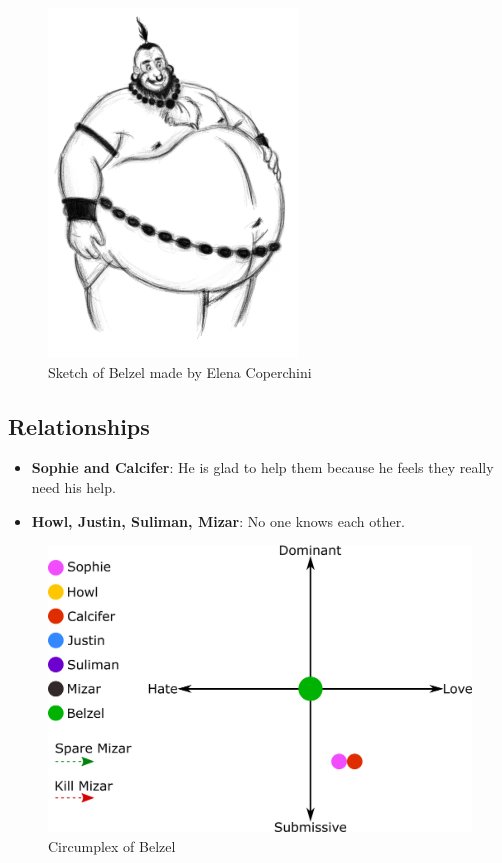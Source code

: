 \hfill\begin{minipage}{0.4\textwidth}
  \begin{figure}[H]
    \hfill\includegraphics{Images/Characters/belzel}
    \caption{Sketch of Belzel made by Elena Coperchini}
  \end{figure}
\end{minipage}

\subsection{Relationships}
\begin{itemize}
\item \textbf{Sophie and Calcifer}: He is glad to help them because he feels they really need his help.
\item \textbf{Howl, Justin, Suliman, Mizar}: No one knows each other.
\end{itemize}

\begin{figure}[H]
  \centering
  \includegraphics[width=14cm]{Images/Diagrams/Circumplexes/belzelCircumplex}
  \caption{Circumplex of Belzel}
\end{figure}

